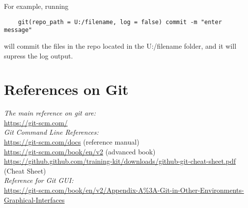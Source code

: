 \documentclass{article}
\begin{document}
For example, running
\begin{verbatim}
    git(repo_path = U:/filename, log = false) commit -m "enter message"
\end{verbatim}

will commit the files in the repo located in the U:/filename folder, and it will supress the log output.

\section{References on Git}

 
 \emph{The main reference on git are:}
 \\ \indent  \url{https://git-scm.com/}  
 \\ \emph{Git Command Line References:}
 \\ \indent  \url{https://git-scm.com/docs}  (reference manual)
 \\ \indent  \url{https://git-scm.com/book/en/v2}  (advanced book)
 \\ \indent  \small{\url{https://github.github.com/training-kit/downloads/github-git-cheat-sheet.pdf}} (Cheat Sheet)
 \\\emph{Reference for Git GUI:}
 \\ \indent \small{ \url{https://git-scm.com/book/en/v2/Appendix-A%3A-Git-in-Other-Environments-Graphical-Interfaces}}
\end{document}
